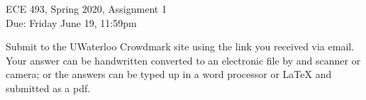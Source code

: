 \documentclass[11pt,onecolumn]{article}
\begin{document}
\begin{center}
\begin{Large}
ECE 493, Spring 2020, Assignment 1\\
Due: Friday June 19, 11:59pm
\end{Large}
\end{center}
\vspace{.2em}

\vspace{.2em}
\begin{center}
Submit to the UWaterloo Crowdmark site using the link you received via email.
Your answer can be handwritten converted to an electronic file by and scanner or camera; or the answers can be typed up in a word processor or LaTeX and submitted as a pdf.
\end{center}
\vspace{.2em}

\vspace{.2em}
\end{document}
